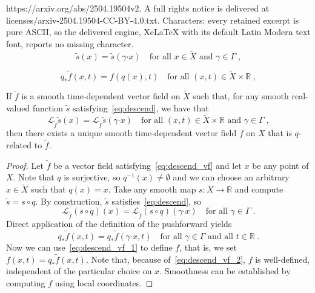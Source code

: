 \documentclass[10pt,a4paper]{amsart}
\newcommand{\DI}{\tilde{X}}	%
\newcommand{\MA}{X}	%
\newcommand{\RR}{\mathbb{R}}	%
\newcommand{\bscdot}{\boldsymbol{\cdot}}
\newcommand{\di}{x}	%
\newcommand{\lie}{\mathcal{L}}	%
\begin{document}
https://arxiv.org/abs/2504.19504v2. A full rights notice is delivered at licenses/arxiv-2504.19504-CC-BY-4.0.txt. Characters: every retained excerpt is pure ASCII, so the delivered engine, XeLaTeX with its default Latin Modern text font, reports no missing character.
 \begin{equation} \label{eq:descend}
  \tilde{s}(\di) = \tilde{s}(\gamma\bscdot\di) \quad \text{for all $\di \in \DI$ and $\gamma \in \Gamma$} \;,
 \end{equation}

\begin{equation} \label{eq:descend_vf_1}
 q_* \tilde{f}(\di,t) = f(q(\di),t) \quad \text{for all $(\di,t) \in \DI\times\RR$} \;, 
\end{equation}

\begin{corollary} \label{cor:descend_vf}
 If $\tilde{f}$ is a smooth time-dependent vector field on $\DI$ such that, for any smooth real-valued function $\tilde{s}$
 satisfying~\eqref{eq:descend}, we have that
 \begin{equation} \label{eq:descend_vf}
  \lie_{\tilde{f}}\tilde{s}(\di) = 
   \lie_{\tilde{f}}\tilde{s}(\gamma\bscdot\di) \quad \text{for all $(\di,t) \in \DI\times\RR$ and $\gamma \in \Gamma$} \;,
 \end{equation}
 then there exists a unique smooth time-dependent vector field $f$ on $\MA$ that is $q$-related to $\tilde{f}$.
\end{corollary}

\begin{proof}
 Let $\tilde{f}$ be a vector field satisfying~\eqref{eq:descend_vf} and let $x$ be any point of
 $\MA$. Note that $q$ is surjective, so $q^{-1}(x) \neq \emptyset$ and we can choose an arbitrary
 $\di \in \DI$ such that $q(\di) = x$. Take any smooth map $s : \MA \to \RR$ and compute
 $\tilde{s} = s\circ q$. By construction, $\tilde{s}$ satisfies~\eqref{eq:descend}, so
 \begin{displaymath}
  \lie_{\tilde{f}}(s\circ q)(\di) = 
   \lie_{\tilde{f}}(s\circ q)(\gamma\bscdot\di) \quad \text{for all $\gamma \in \Gamma$} \;.
 \end{displaymath}
 Direct application of the definition of the pushforward yields
 \begin{equation} \label{eq:descend_vf_2}
  q_*\tilde{f}(\di,t) = q_*\tilde{f}(\gamma\bscdot\di,t) \quad \text{for all $\gamma \in \Gamma$ and all $t \in \RR$} \;.
 \end{equation}
 Now we can use~\eqref{eq:descend_vf_1} to define $f$, that is, we set $f(x,t) = q_* \tilde{f}(\di,t)$.
 Note that, because of~\eqref{eq:descend_vf_2}, $f$ is well-defined, independent of the particular
 choice on $\di$. Smoothness can be established by computing $f$ using local coordinates.
\end{proof}
\end{document}

